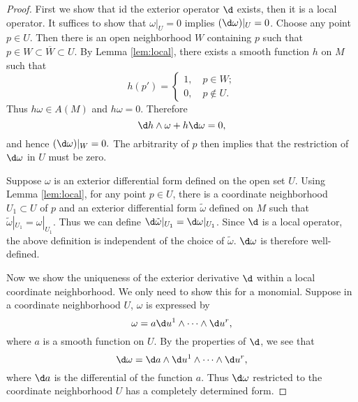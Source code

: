 \documentclass[11pt]{article}
\begin{document}
\begin{proof}
    First we show that id the exterior operator $\d$ exists, then it is a local operator. It suffices to show that $\omega|_U = 0$ implies $(\d\omega)|_U = 0$. Choose any point $p \in U$. Then there is an open neighborhood $W$ containing $p$ such that $p \in W \subset \overline{W} \subset U$. By Lemma \ref{lem:local}, there exists a smooth function $h$ on $M$ such that $$h(p') = \begin{cases} 1, \quad p \in W; \\ 0, \quad p \not\in U.\end{cases}$$ Thus $h\omega \in A(M)$ and $h\omega = 0$. Therefore $$\d h \wedge \omega + h\d\omega = 0,$$ and hence $(\d\omega)|_W = 0.$ The arbitrarity of $p$ then implies that the restriction of $\d\omega$ in $U$ must be zero. 

    Suppose $\omega$ is an exterior differential form defined on the open set $U$. Using Lemma \ref{lem:local}, for any point $p \in U$, there is a coordinate neighborhood $U_1 \subset U$ of $p$ and an exterior differential form $\tilde\omega$ defined on $M$ such that $\tilde\omega|_{U_1} = \omega|_{U_1}$. Thus we can define $\d\tilde\omega|_{U_1} = \d\omega|_{U_1}$. Since $\d$ is a local operator, the above definition is independent of the choice of $\tilde\omega$. $\d\omega$ is therefore well-defined. 

    Now we show the uniqueness of the exterior derivative $\d$ within a local coordinate neighborhood. We only need to show this for a monomial. Suppose in a coordinate neighborhood $U$, $\omega$ is expressed by $$\omega = a \d u^1 \wedge \cdots \wedge \d u^r,$$ where $a$ is a smooth function on $U$. By the properties of $\d$, we see that $$\d\omega = \d a \wedge \d u^1 \wedge \cdots \wedge \d u^r,$$ where $\d a$ is the differential of the function $a$. Thus $\d\omega$ restricted to the coordinate neighborhood $U$ has a completely determined form. 


\end{proof}
\end{document}

